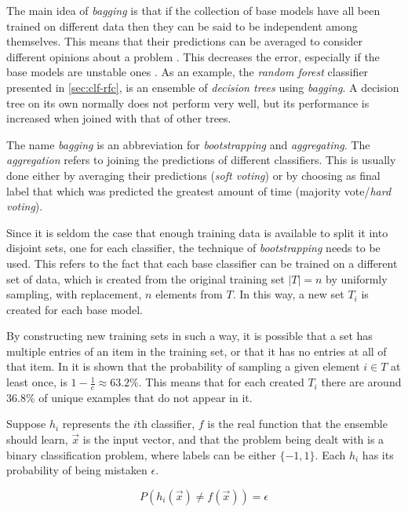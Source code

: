 \documentclass[epsfig,a4paper,11pt,titlepage,twoside,openany]{book}
\begin{document}
The main idea of \textit{bagging} \cite{zhou2012ensemble,Breiman1996_bagging_predictors} is that if the collection of base models have all been trained on different data then they can be said to be independent among themselves. This means that their predictions can be averaged to consider different opinions about a problem \cite{Breiman1996_bagging_predictors}. This decreases the error, especially if the base models are unstable ones \cite{zhou2012ensemble}. As an example, the \textit{random forest} classifier presented in \autoref{sec:clf-rfc}, is an ensemble of \textit{decision trees} using \textit{bagging}. A decision tree on its own normally does not perform very well, but its performance is increased when joined with that of other trees.

The name \textit{bagging} is an abbreviation for \textit{bootstrapping} and \textit{aggregating}. The \textit{aggregation} refers to joining the predictions of different classifiers. This is usually done either by averaging their predictions (\textit{soft voting}) or by choosing as final label that which was predicted the greatest amount of time (majority vote/\textit{hard voting}). 

Since it is seldom the case that enough training data is available to split it into disjoint sets, one for each classifier, the technique of \textit{bootstrapping} needs to be used. This refers to the fact that each base classifier can be trained on a different set of data, which is created from the original training set $|T| = n$ by uniformly sampling, with replacement, $n$ elements from $T$. In this way, a new set $T_i$ is created for each base model.

By constructing new training sets in such a way, it is possible that a set has multiple entries of an item in the training set, or that it has no entries at all of that item. In \cite{Breiman1996_bagging_predictors} it is shown that the probability of sampling a given element $i \in T$ at least once, is $1 - \frac{1}{e} \approx 63.2\%$. This means that for each created $T_i$ there are around $36.8\%$ of unique examples that do not appear in it.

Suppose $h_i$ represents the $i$th classifier, $f$ is the real function that the ensemble should learn, $\vec{x}$ is the input vector, and that the problem being dealt with is a binary classification problem, where labels can be either $\{-1,1\}$. Each $h_i$ has its probability of being mistaken $\epsilon$.

\begin{equation*}
    P(h_i(\vec{x}) \neq f(\vec{x})) = \epsilon
\end{equation*}
\end{document}
